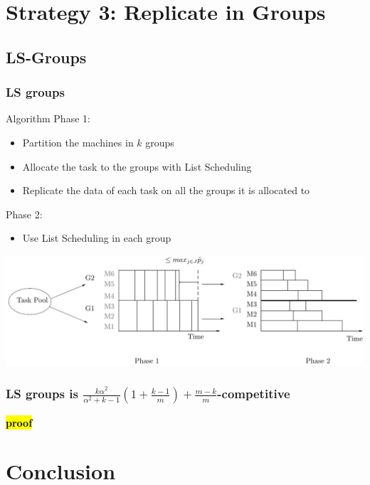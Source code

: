 \documentclass[usenames,dvipsnames]{beamer}
\newcommand{\todo}[1]{{\color{red}\textbf{\hl{#1}}\xspace}}
\begin{document}
\section{Strategy 3: Replicate in Groups}

\subsection{LS-Groups}

\begin{frame}
  \frametitle{LS groups}

  \begin{block}{Algorithm}
    Phase 1:
    \begin{itemize}
    \item Partition the machines in $k$ groups
    \item Allocate the task to the groups with List Scheduling
    \item Replicate the data of each task on all the groups it is allocated to
    \end{itemize}
    
    Phase 2:
    \begin{itemize}
    \item Use List Scheduling in each group
    \end{itemize}    
  \end{block}
  
  \includegraphics[width=\textwidth]{figs/model3.pdf}
\end{frame}

\begin{frame}
  \frametitle{LS groups is $ \frac{k\alpha^{2}}{\alpha^{2}+k-1} (1+
    \frac{k-1}{m} ) + \frac{m-k}{m}$-competitive }
  
  \todo{proof}

\end{frame}



\section{Conclusion}
\end{document}
